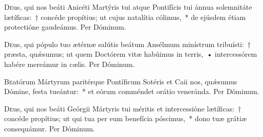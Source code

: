 \documentclass[vesperale_romanum.tex]{subfiles}
\begin{document}
\myrule
{}

\oratio

\lettrine{D}{e}us, qui nos beáti Anicéti Martýris tui atque Pontifícis tui ánnua solemnitáte lætíficas:~† concéde propítius; ut cujus natalítia cólimus,~* de ejúsdem étiam protectióne gaudeámus. Per Dóminum.

\myrule
{}

\duplex

\odoctoroptime

\oratio

\lettrine{D}{e}us, qui pópulo tuo ætérnæ salútis beátum Ansélmum minístrum tribuísti:~† præsta, quǽsumus; ut quem Doctórem vitæ habúimus in terris,~• intercessórem habére mereámur in cælis. Per Dóminum.

\commsequentis

\myrule
{}

\semiduplex


\oratio

\lettrine{B}{e}atórum Mártyrum paritérque Pontíficum Sotéris et Caii nos, quǽsumus Dómine, festa tueántur:~* et eórum comméndet orátio veneránda. Per Dóminum.

\capitdeseq

\myrule
\newpage
{}

\semiduplex

\oratio

\lettrine{D}{e}us, qui nos beáti Geórgii Mártyris tui méritis et intercessióne lætíficas:~† concéde propítius; ut qui tua per eum benefícia póscimus,~* dono tuæ grátiæ consequámur.
Per Dóminum.


\vespsequentiscomm

\myrule
{}
\end{document}

